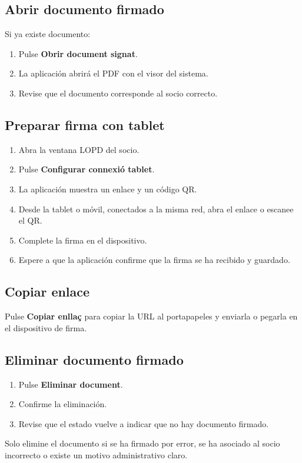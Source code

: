 \documentclass[12pt]{article}
\newcommand{\boton}[1]{\textbf{#1}}
\begin{document}
\subsection{Abrir documento firmado}
Si ya existe documento:
\begin{enumerate}
  \item Pulse \boton{Obrir document signat}.
  \item La aplicación abrirá el PDF con el visor del sistema.
  \item Revise que el documento corresponde al socio correcto.
\end{enumerate}

\subsection{Preparar firma con tablet}
\begin{enumerate}
  \item Abra la ventana LOPD del socio.
  \item Pulse \boton{Configurar connexió tablet}.
  \item La aplicación muestra un enlace y un código QR.
  \item Desde la tablet o móvil, conectados a la misma red, abra el enlace o escanee el QR.
  \item Complete la firma en el dispositivo.
  \item Espere a que la aplicación confirme que la firma se ha recibido y guardado.
\end{enumerate}

\subsection{Copiar enlace}
Pulse \boton{Copiar enllaç} para copiar la URL al portapapeles y enviarla o pegarla en el dispositivo de firma.

\subsection{Eliminar documento firmado}
\begin{enumerate}
  \item Pulse \boton{Eliminar document}.
  \item Confirme la eliminación.
  \item Revise que el estado vuelve a indicar que no hay documento firmado.
\end{enumerate}

Solo elimine el documento si se ha firmado por error, se ha asociado al socio incorrecto o existe un motivo administrativo claro.
\end{document}
